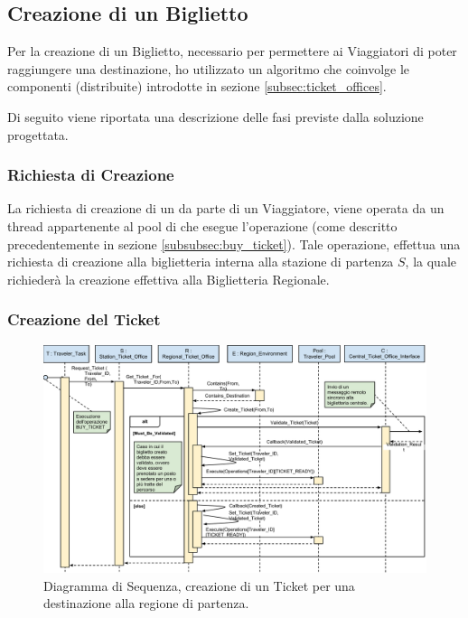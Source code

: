 \newpage
\subsection{Creazione di un Biglietto}\label{subsec:ticket_creation}

Per la creazione di un Biglietto, necessario per permettere ai Viaggiatori di poter raggiungere una destinazione, ho utilizzato un algoritmo che coinvolge le componenti (distribuite) introdotte in sezione \ref{subsec:ticket_offices}.

Di seguito viene riportata una descrizione delle fasi previste dalla soluzione progettata.

	\subsubsection {Richiesta di Creazione}\label{subsubsec:ticket_creation_request}
	
	La richiesta di creazione di un  da parte di un Viaggiatore, viene operata da un thread appartenente al pool di  che esegue l'operazione  (come descritto precedentemente in sezione \ref{subsubsec:buy_ticket}). Tale operazione, effettua una richiesta di creazione alla biglietteria interna alla stazione di partenza $S$, la quale richiederà la creazione effettiva alla Biglietteria Regionale.%
	
	\subsubsection {Creazione del Ticket} \label{subsubsec:ticket_creation}
	
	\begin{figure}[htbp]
		\includegraphics[trim = 55mm 0mm 0mm 0mm,scale=0.5]{imgs/Buy_Ticket_Sequence_Diagram.pdf}
		\caption{\footnotesize{Diagramma di Sequenza, creazione di un Ticket per una destinazione  alla regione di partenza.}}
		\label{fig:local_ticket_creation_diagram}
	\end{figure}
	
